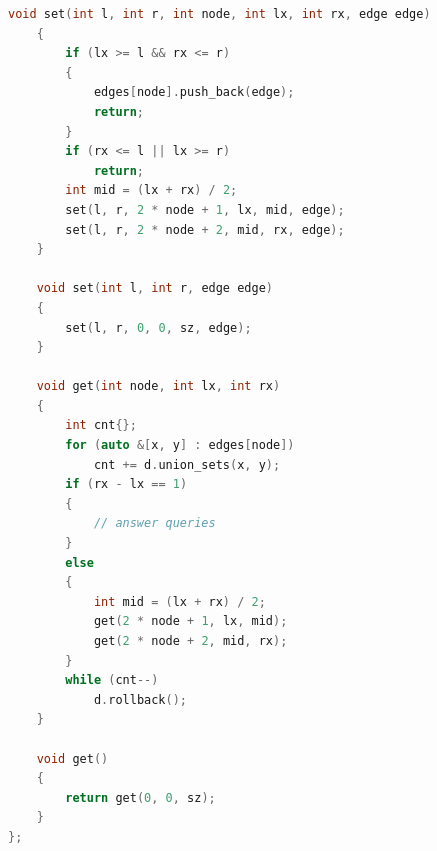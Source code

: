 \documentclass[10pt,landscape,a4paper,twocolumn]{article}
\begin{document}
\begin{lstlisting}[language=C++]
    void set(int l, int r, int node, int lx, int rx, edge edge)
    {
        if (lx >= l && rx <= r)
        {
            edges[node].push_back(edge);
            return;
        }
        if (rx <= l || lx >= r)
            return;
        int mid = (lx + rx) / 2;
        set(l, r, 2 * node + 1, lx, mid, edge);
        set(l, r, 2 * node + 2, mid, rx, edge);
    }

    void set(int l, int r, edge edge)
    {
        set(l, r, 0, 0, sz, edge);
    }

    void get(int node, int lx, int rx)
    {
        int cnt{};
        for (auto &[x, y] : edges[node])
            cnt += d.union_sets(x, y);
        if (rx - lx == 1)
        {
            // answer queries
        }
        else
        {
            int mid = (lx + rx) / 2;
            get(2 * node + 1, lx, mid);
            get(2 * node + 2, mid, rx);
        }
        while (cnt--)
            d.rollback();
    }

    void get()
    {
        return get(0, 0, sz);
    }
};

\end{lstlisting}
\end{document}
